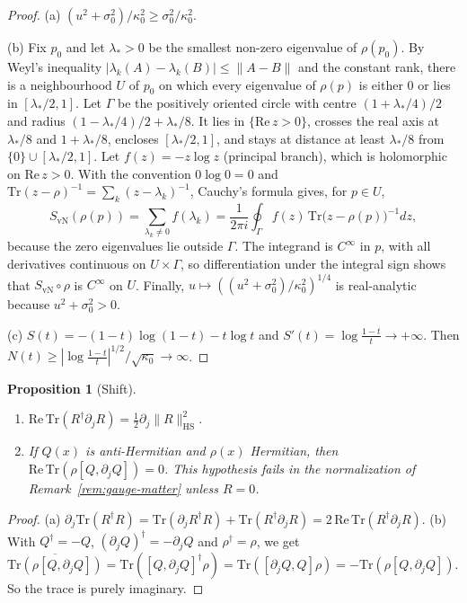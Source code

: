 \documentclass[11pt,a4paper,reqno]{amsart}
\newtheorem{proposition}[theorem]{Proposition}
\theoremstyle{definition}
\numberwithin{equation}{section}
\newcommand{\Tr}{\mathrm{Tr}}
\newcommand{\HS}{\mathrm{HS}}
\begin{document}
\begin{proof}
(a) $(u^2+\sigma_0^2)/\kappa_0^2\ge\sigma_0^2/\kappa_0^2$.

(b) Fix $p_0$ and let $\lambda_*>0$ be the smallest non-zero eigenvalue of $\rho(p_0)$. By Weyl's inequality $|\lambda_k(A)-\lambda_k(B)|\le\|A-B\|$ and the constant rank, there is a neighbourhood $U$ of $p_0$ on which every eigenvalue of $\rho(p)$ is either $0$ or lies in $[\lambda_*/2,1]$. Let $\Gamma$ be the positively oriented circle with centre $(1+\lambda_*/4)/2$ and radius $(1-\lambda_*/4)/2+\lambda_*/8$. It lies in $\{\mathrm{Re}\,z>0\}$, crosses the real axis at $\lambda_*/8$ and $1+\lambda_*/8$, encloses $[\lambda_*/2,1]$, and stays at distance at least $\lambda_*/8$ from $\{0\}\cup[\lambda_*/2,1]$. Let $f(z)=-z\log z$ (principal branch), which is holomorphic on $\mathrm{Re}\,z>0$. With the convention $0\log0=0$ and $\Tr(z-\rho)^{-1}=\sum_k(z-\lambda_k)^{-1}$, Cauchy's formula gives, for $p\in U$,
\[
S_{\mathrm{vN}}(\rho(p))=\sum_{\lambda_k\neq0}f(\lambda_k)=\frac{1}{2\pi i}\oint_\Gamma f(z)\,\Tr\big(z-\rho(p)\big)^{-1}dz ,
\]
because the zero eigenvalues lie outside $\Gamma$. The integrand is $C^\infty$ in $p$, with all derivatives continuous on $U\times\Gamma$, so differentiation under the integral sign shows that $S_{\mathrm{vN}}\circ\rho$ is $C^\infty$ on $U$. Finally, $u\mapsto((u^2+\sigma_0^2)/\kappa_0^2)^{1/4}$ is real-analytic because $u^2+\sigma_0^2>0$.

(c) $S(t)=-(1-t)\log(1-t)-t\log t$ and $S'(t)=\log\frac{1-t}{t}\to+\infty$. Then $N(t)\ge|\log\tfrac{1-t}{t}|^{1/2}/\sqrt{\kappa_0}\to\infty$.
\end{proof}

\begin{proposition}[Shift]\label{prop:shift}
\begin{enumerate}[label=(\alph*)]
    \item $\mathrm{Re}\,\Tr(R^\dagger\partial_jR)=\tfrac12\partial_j\|R\|_{\HS}^2$.
    \item If $Q(x)$ is anti-Hermitian and $\rho(x)$ Hermitian, then $\mathrm{Re}\,\Tr(\rho[Q,\partial_jQ])=0$. This hypothesis fails in the normalization of Remark~\ref{rem:gauge-matter} unless $R=0$.
\end{enumerate}
\end{proposition}

\begin{proof}
(a) $\partial_j\Tr(R^\dagger R)=\Tr(\partial_jR^\dagger R)+\Tr(R^\dagger\partial_jR)=2\,\mathrm{Re}\,\Tr(R^\dagger\partial_jR)$.
(b) With $Q^\dagger=-Q$, $(\partial_jQ)^\dagger=-\partial_jQ$ and $\rho^\dagger=\rho$, we get $\overline{\Tr(\rho[Q,\partial_jQ])}=\Tr([Q,\partial_jQ]^\dagger\rho)=\Tr([\partial_jQ,Q]\rho)=-\Tr(\rho[Q,\partial_jQ])$. So the trace is purely imaginary.
\end{proof}
\end{document}
